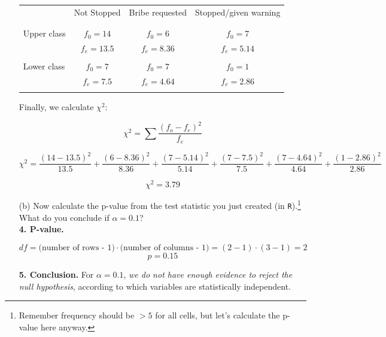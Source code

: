 \documentclass[12pt,letterpaper]{article}
\begin{document}
\begin{enumerate}
		\begin{table}[H]
			\centering
			\begin{tabular}{l | c c c }
				& Not Stopped & Bribe requested & Stopped/given warning \\
				\\ [-1.8ex] 
				\hline \\[-1.8ex]
 				Upper class	& $f_0=14$ & $f_0=6$ & $f_0=7$ \\
 							& $f_e=13.5$ & $f_e=8.36$ & $f_e=5.14$ \\
 				\\ [-1.8ex]
				Lower class	& $f_0=7$ & $f_0=7$ & $f_0=1$ \\
							& $f_e=7.5$ & $f_e=4.64$ & $f_e=2.86$ \\
				\\[-1.8ex]
				\hline
			\end{tabular}
		\end{table}

		Finally, we calculate $\chi^2$:
		
			$$\chi^2 = \sum{\frac{(f_o-f_e)^2}{f_e}}$$
		
			$$\chi^2 = \frac{(14-13.5)^2}{13.5} + \frac{(6-8.36)^2}{8.36} + \frac{(7-5.14)^2}{5.14} + \frac{(7-7.5)^2}{7.5} + \frac{(7-4.64)^2}{4.64} + \frac{(1-2.86)^2}{2.86}$$
		
			$$\chi^2 = 3.79$$
		
			
		
		\vspace{.5cm}
	
		\item [(b)]
		Now calculate the p-value from the test statistic you just created (in \texttt{R}).\footnote{Remember frequency should be $>5$ for all cells, but let's calculate the p-value here anyway.}  What do you conclude if $\alpha = 0.1$?\\
		
		\textbf{4. P-value.}
		
			
		
		$$df = \text{(number of rows - 1)} \cdot \text{(number of columns - 1)} = (2-1) \cdot (3-1) = 2$$
		$$p = 0.15$$
		
		\textbf{5. Conclusion.} For $\alpha = 0.1$, \textit{we do not have enough evidence to reject the null hypothesis}, according to which variables are statistically independent.
		

\end{enumerate}
\end{document}
